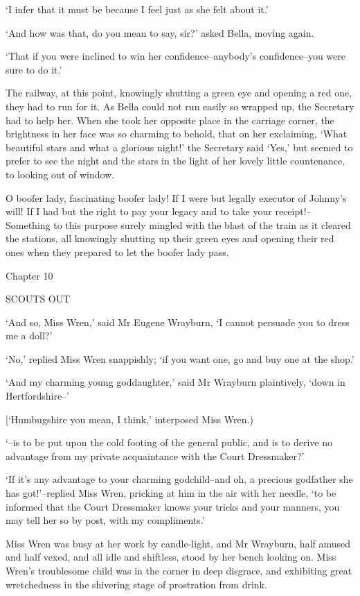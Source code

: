 ‘I infer that it must be because I feel just as she felt about it.’

‘And how was that, do you mean to say, sir?’ asked Bella, moving again.

‘That if you were inclined to win her confidence--anybody’s
confidence--you were sure to do it.’

The railway, at this point, knowingly shutting a green eye and opening
a red one, they had to run for it. As Bella could not run easily so
wrapped up, the Secretary had to help her. When she took her opposite
place in the carriage corner, the brightness in her face was so charming
to behold, that on her exclaiming, ‘What beautiful stars and what a
glorious night!’ the Secretary said ‘Yes,’ but seemed to prefer to see
the night and the stars in the light of her lovely little countenance,
to looking out of window.

O boofer lady, fascinating boofer lady! If I were but legally executor
of Johnny’s will! If I had but the right to pay your legacy and to take
your receipt!--Something to this purpose surely mingled with the blast
of the train as it cleared the stations, all knowingly shutting up their
green eyes and opening their red ones when they prepared to let the
boofer lady pass.



Chapter 10

SCOUTS OUT


‘And so, Miss Wren,’ said Mr Eugene Wrayburn, ‘I cannot persuade you to
dress me a doll?’

‘No,’ replied Miss Wren snappishly; ‘if you want one, go and buy one at
the shop.’

‘And my charming young goddaughter,’ said Mr Wrayburn plaintively, ‘down
in Hertfordshire--’

[‘Humbugshire you mean, I think,’ interposed Miss Wren.)

‘--is to be put upon the cold footing of the general public, and is
to derive no advantage from my private acquaintance with the Court
Dressmaker?’

‘If it’s any advantage to your charming godchild--and oh, a precious
godfather she has got!’--replied Miss Wren, pricking at him in the air
with her needle, ‘to be informed that the Court Dressmaker knows
your tricks and your manners, you may tell her so by post, with my
compliments.’

Miss Wren was busy at her work by candle-light, and Mr Wrayburn, half
amused and half vexed, and all idle and shiftless, stood by her bench
looking on. Miss Wren’s troublesome child was in the corner in deep
disgrace, and exhibiting great wretchedness in the shivering stage of
prostration from drink.

